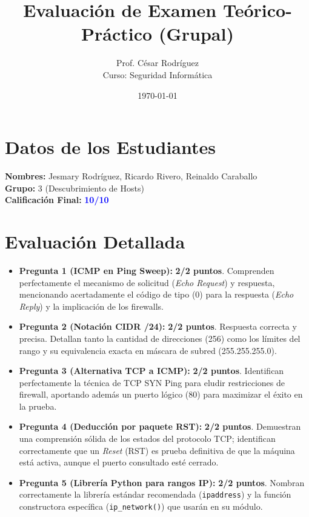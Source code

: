 \documentclass[12pt,a4paper]{article}
\title{Evaluación de Examen Teórico-Práctico (Grupal)}
\author{Prof. César Rodríguez \\ \small Curso: Seguridad Informática}
\date{\today}
\begin{document}
\maketitle

\section*{Datos de los Estudiantes}
\textbf{Nombres:} Jesmary Rodríguez, Ricardo Rivero, Reinaldo Caraballo \\
\textbf{Grupo:} 3 (Descubrimiento de Hosts) \\
\textbf{Calificación Final:} \textbf{\textcolor{blue}{10/10}}

\section*{Evaluación Detallada}

\begin{itemize}[label=$\bullet$]
    \item \textbf{Pregunta 1 (ICMP en Ping Sweep):} \textbf{2/2 puntos}. Comprenden perfectamente el mecanismo de solicitud (\textit{Echo Request}) y respuesta, mencionando acertadamente el código de tipo (0) para la respuesta (\textit{Echo Reply}) y la implicación de los firewalls.
    
    \item \textbf{Pregunta 2 (Notación CIDR /24):} \textbf{2/2 puntos}. Respuesta correcta y precisa. Detallan tanto la cantidad de direcciones (256) como los límites del rango y su equivalencia exacta en máscara de subred (255.255.255.0).
    
    \item \textbf{Pregunta 3 (Alternativa TCP a ICMP):} \textbf{2/2 puntos}. Identifican perfectamente la técnica de TCP SYN Ping para eludir restricciones de firewall, aportando además un puerto lógico (80) para maximizar el éxito en la prueba.
    
    \item \textbf{Pregunta 4 (Deducción por paquete RST):} \textbf{2/2 puntos}. Demuestran una comprensión sólida de los estados del protocolo TCP; identifican correctamente que un \textit{Reset} (RST) es prueba definitiva de que la máquina está activa, aunque el puerto consultado esté cerrado.
    
    \item \textbf{Pregunta 5 (Librería Python para rangos IP):} \textbf{2/2 puntos}. Nombran correctamente la librería estándar recomendada (\texttt{ipaddress}) y la función constructora específica (\texttt{ip\_network()}) que usarán en su módulo.
\end{itemize}
\end{document}
